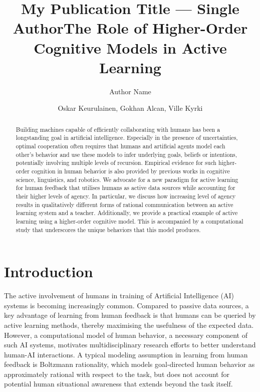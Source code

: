 \documentclass[letterpaper]{article} %
\title{My Publication Title --- Single Author}
\author {
    Author Name
}
\title{The Role of Higher-Order Cognitive Models in Active Learning}
\author {
    Oskar Keurulainen, %
    Gokhan Alcan, %
    Ville Kyrki%
}
\begin{document}
\maketitle

\begin{abstract}

Building machines capable of efficiently collaborating with humans has been a longstanding goal in artificial intelligence. Especially in the presence of uncertainties, optimal cooperation often requires that humans and artificial agents model each other's behavior and use these models to infer underlying goals, beliefs or intentions, potentially involving multiple levels of recursion. Empirical evidence for such higher-order cognition in human behavior is also provided by previous works in cognitive science, linguistics, and robotics. We advocate for a new paradigm for active learning for human feedback that utilises humans as active data sources while accounting for their higher levels of agency. In particular, we discuss how increasing level of agency results in qualitatively different forms of rational communication between an active learning system and a teacher. Additionally, we provide a practical example of active learning using a higher-order cognitive model. This is accompanied by a computational study that underscores the unique behaviors that this model produces.

\end{abstract}

\insert{}

\section{Introduction}

The active involvement of humans in training of Artificial Intelligence (AI) systems is becoming increasingly common. Compared to passive data sources, a key advantage of learning from human feedback is that humans can be queried by active learning methods, thereby maximising the usefulness of the expected data. However, a computational model of human behavior, a necessary component of such AI systems, motivates multidisciplinary research efforts to better understand human-AI interactions. A typical modeling assumption in learning from human feedback is Boltzmann rationality, which models goal-directed human behavior as approximately rational with respect to the task, but does not account for potential human situational awareness that extends beyond the task itself.
\end{document}
